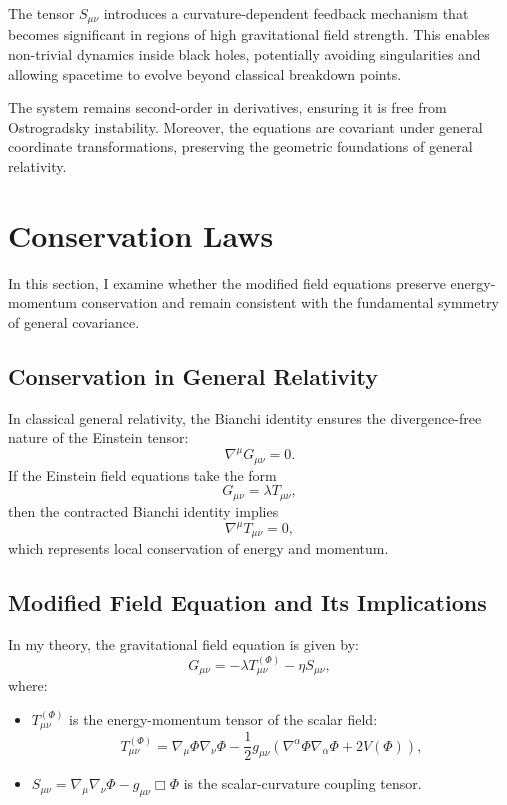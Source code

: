 \documentclass[12pt]{article}
\begin{document}
The tensor \( S_{\mu\nu} \) introduces a curvature-dependent feedback mechanism that becomes significant in regions of high gravitational field strength. This enables non-trivial dynamics inside black holes, potentially avoiding singularities and allowing spacetime to evolve beyond classical breakdown points.

The system remains second-order in derivatives, ensuring it is free from Ostrogradsky instability. Moreover, the equations are covariant under general coordinate transformations, preserving the geometric foundations of general relativity.

\section{Conservation Laws}

In this section, I examine whether the modified field equations preserve energy-momentum conservation and remain consistent with the fundamental symmetry of general covariance.

\subsection{Conservation in General Relativity}

In classical general relativity, the Bianchi identity ensures the divergence-free nature of the Einstein tensor:
\begin{equation}
\nabla^\mu G_{\mu\nu} = 0.
\end{equation}
If the Einstein field equations take the form
\begin{equation}
G_{\mu\nu} = \lambda T_{\mu\nu},
\end{equation}
then the contracted Bianchi identity implies
\begin{equation}
\nabla^\mu T_{\mu\nu} = 0,
\end{equation}
which represents local conservation of energy and momentum.

\subsection{Modified Field Equation and Its Implications}

In my theory, the gravitational field equation is given by:
\begin{equation}
G_{\mu\nu} = -\lambda T_{\mu\nu}^{(\Phi)} - \eta S_{\mu\nu},
\label{eq:mod_grav}
\end{equation}
where:
\begin{itemize}
    \item \( T_{\mu\nu}^{(\Phi)} \) is the energy-momentum tensor of the scalar field:
    \[
    T_{\mu\nu}^{(\Phi)} = \nabla_\mu \Phi \nabla_\nu \Phi - \frac{1}{2} g_{\mu\nu} \left( \nabla^\alpha \Phi \nabla_\alpha \Phi + 2V(\Phi) \right),
    \]
    \item \( S_{\mu\nu} = \nabla_\mu \nabla_\nu \Phi - g_{\mu\nu} \Box \Phi \) is the scalar-curvature coupling tensor.
\end{itemize}
\end{document}
